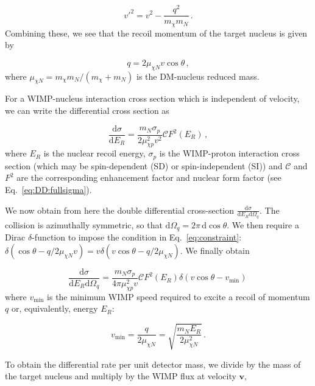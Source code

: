 \begin{equation}
\label{eq:Energy}
v'^2 = v^2 - \frac{q^2}{m_\chi m_N} \,.
\end{equation}
Combining these, we see that the recoil momentum of the target nucleus is given by

\begin{equation}
\label{eq:constraint}
q = 2\mu_{\chi N} v \cos \theta \,,
\end{equation}
where \(\mu_{\chi N} = m_\chi m_N/(m_\chi + m_N)\) is the DM-nucleus reduced mass.


For a WIMP-nucleus interaction cross section which is independent of velocity, we can write the differential cross section as 

\begin{equation}
\frac{\textrm{d}\sigma}{\textrm{d}E_R} = \frac{m_N \sigma_p}{2 \mu_{\chi p}^2 v^2} \mathcal{C} F^2(E_R)\,,
\end{equation}
where \(E_R\) is the nuclear recoil energy, \(\sigma_p\) is the WIMP-proton interaction cross section (which may be spin-dependent (SD) or spin-independent (SI)) and $\mathcal{C}$ and $F^2$ are the corresponding enhancement factor and nuclear form factor (see Eq.~\ref{eq:DD:fullsigma}).

We now obtain from here the double differential cross-section \(\frac{\textrm{d}\sigma}{\textrm{d}E_R \textrm{d}\Omega_q}\). The collision is azimuthally symmetric, so that \(\textrm{d}\Omega_q = 2\pi\,\textrm{d}\cos\theta\). We then require a Dirac \(\delta\)-function to impose the condition in Eq.\ \ref{eq:constraint}: \(\delta\left(\cos\theta - q/2\mu_{\chi N}v\right) = v \delta\left(v \cos\theta - q/2\mu_{\chi N}\right)\). We finally obtain

\begin{equation}
\frac{\textrm{d}\sigma}{\textrm{d}E_R \textrm{d}\Omega_q} = \frac{m_N \sigma_p}{4\pi\mu_{\chi p}^2v} \mathcal{C} F^2(E_R) \delta\left(v \cos\theta - v_\textrm{min}\right)\,
\end{equation}
where \(v_\textrm{min}\) is the minimum WIMP speed required to excite a recoil of momentum \(q\) or, equivalently, energy \(E_R\):

\begin{equation}
v_\textrm{min} = \frac{q}{2\mu_{\chi N}} = \sqrt{\frac{m_N E_R}{2\mu_{\chi N}^2}}\,.
\end{equation}

To obtain the differential rate per unit detector mass, we divide by the mass of the target nucleus and multiply by the WIMP flux at velocity \(\textbf{v}\),

